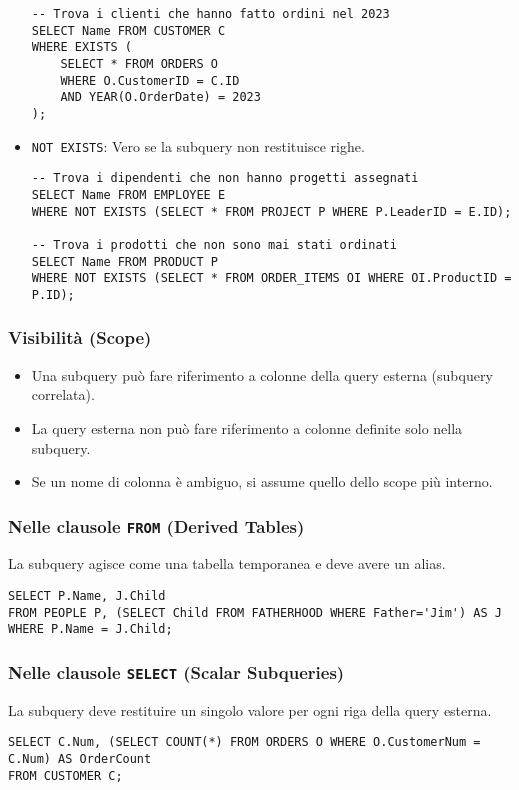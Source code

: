 \begin{itemize}
\begin{verbatim}
-- Trova i clienti che hanno fatto ordini nel 2023
SELECT Name FROM CUSTOMER C
WHERE EXISTS (
    SELECT * FROM ORDERS O 
    WHERE O.CustomerID = C.ID 
    AND YEAR(O.OrderDate) = 2023
);
		\end{verbatim}
		\item \texttt{NOT EXISTS}: Vero se la subquery non restituisce righe.
		\begin{verbatim}
-- Trova i dipendenti che non hanno progetti assegnati
SELECT Name FROM EMPLOYEE E
WHERE NOT EXISTS (SELECT * FROM PROJECT P WHERE P.LeaderID = E.ID);

-- Trova i prodotti che non sono mai stati ordinati
SELECT Name FROM PRODUCT P
WHERE NOT EXISTS (SELECT * FROM ORDER_ITEMS OI WHERE OI.ProductID = P.ID);
		\end{verbatim}
	\end{itemize}
	
	\subsubsection{Visibilità (Scope)}
	\begin{itemize}
		\item Una subquery può fare riferimento a colonne della query esterna (subquery correlata).
		\item La query esterna non può fare riferimento a colonne definite solo nella subquery.
		\item Se un nome di colonna è ambiguo, si assume quello dello scope più interno.
	\end{itemize}
	
	\subsubsection{Nelle clausole \texttt{FROM} (Derived Tables)}
	La subquery agisce come una tabella temporanea e deve avere un alias.
	\begin{verbatim}
SELECT P.Name, J.Child
FROM PEOPLE P, (SELECT Child FROM FATHERHOOD WHERE Father='Jim') AS J
WHERE P.Name = J.Child;
	\end{verbatim}
	
	\subsubsection{Nelle clausole \texttt{SELECT} (Scalar Subqueries)}
	La subquery deve restituire un singolo valore per ogni riga della query esterna.
	\begin{verbatim}
SELECT C.Num, (SELECT COUNT(*) FROM ORDERS O WHERE O.CustomerNum = C.Num) AS OrderCount
FROM CUSTOMER C;
	\end{verbatim}
	
